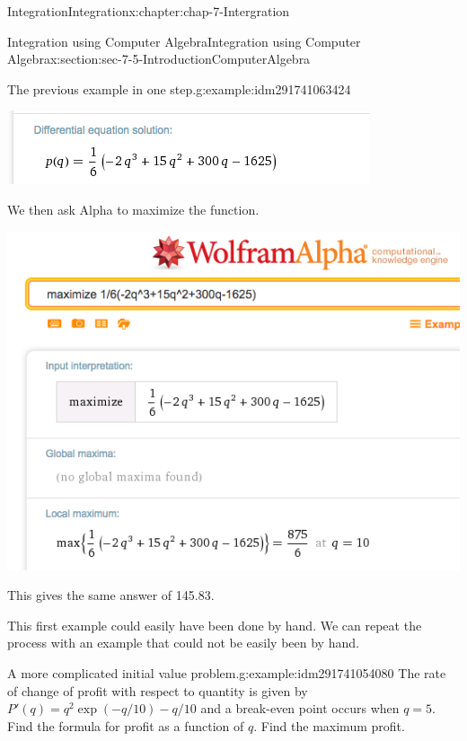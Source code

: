 \documentclass[oneside,10pt,]{book}
\numberwithin{equation}{section}
\begin{document}
\begin{chapterptx}{Integration}{}{Integration}{}{}{x:chapter:chap-7-Intergration}
\begin{sectionptx}{Integration using Computer Algebra}{}{Integration using Computer Algebra}{}{}{x:section:sec-7-5-IntroductionComputerAlgebra}
\begin{example}{The previous example in one step.}{g:example:idm291741063424}
\begin{sidebyside}{1}{0.15}{0.15}{0}
\begin{sbspanel}{0.7}
\end{sbspanel}%
\end{sidebyside}%
\begin{sidebyside}{1}{0.15}{0.15}{0}%
\begin{sbspanel}{0.7}%
\includegraphics[width=\linewidth]{images/sec7-5-18.png}
\end{sbspanel}%
\end{sidebyside}%
\par
We then ask Alpha to maximize the function.%
\begin{sidebyside}{1}{0.05}{0.05}{0}%
\begin{sbspanel}{0.9}%
\includegraphics[width=\linewidth]{images/sec7-5-19.png}
\end{sbspanel}%
\end{sidebyside}%
\par
This gives the same answer of \textdollar{}145.83.%
\end{example}
This first example could easily have been done by hand.  We can repeat the process with an example that could not be easily been by hand.%
\begin{example}{A more complicated initial value problem.}{g:example:idm291741054080}%
The rate of change of profit with respect to quantity is given by \(P' (q)=q^2  \exp(-q/10)-q/10\) and a break-even point occurs when \(q = 5\).  Find the formula for profit as a function of \(q\).  Find the maximum profit.%

\end{example}
\end{sectionptx}
\end{chapterptx}
\end{document}
